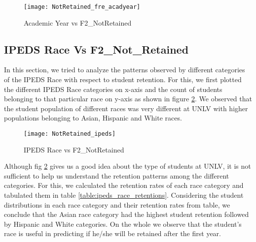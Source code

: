 \documentclass[11pt,openright]{report}
\begin{document}
\begin{figure}[!htbp]
	\centering
	\texttt{[image: NotRetained\_fre\_acadyear]}
	\caption{Academic Year vs F2\_NotRetained}
	\label{fig:AcadYear_F2NotRetained_plot}
\end{figure}

\subsection {IPEDS Race Vs F2\_Not\_Retained}
In this section, we tried to analyze the patterns observed by different categories of the IPEDS Race with respect to student retention. For this, we first plotted the different IPEDS Race categories on x-axis and the count of students belonging to that particular race on y-axis as shown in figure \ref{fig:ipeds_F2NotRetained_plot}. We observed that the student population of different races was very different at UNLV with higher populations belonging to Asian, Hispanic and White races.
\begin{figure}[!ht]
	\centering
	\texttt{[image: NotRetained\_ipeds]}
	\caption{IPEDS Race vs F2\_NotRetained}
	\label{fig:ipeds_F2NotRetained_plot}
\end{figure}

Although fig \ref{fig:ipeds_F2NotRetained_plot} gives us a good idea about the type of students at UNLV, it is not sufficient to help us understand the retention patterns among the different categories. For this, we calculated the retention rates of each race category and tabulated them in table \ref{table:ipeds_race_retentions}. Considering the student distributions in each race category and their retention rates from table, we conclude that the Asian race category had the highest student retention followed by Hispanic and White categories. On the whole we observe that the student's race is useful in predicting if he/she will be retained after the first year.
\end{document}
